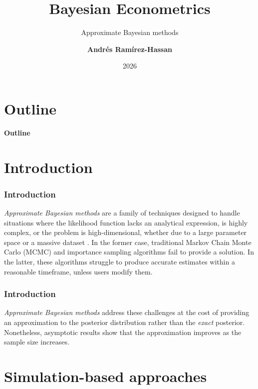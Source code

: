 \documentclass[12pt, compress]{beamer}
\title{Bayesian Econometrics}
\subtitle{Approximate Bayesian methods}
\date{2026}
\author[Andr\'e Ram\'irez H.]{\textbf{Andr\'es Ram\'irez-Hassan}}
\institute[EAFIT]{\small{Universidad EAFIT\\School of Finance, Economics and Government}}
\begin{document}
	
	\maketitle
	
	
	
	
	\section*{Outline}
	\begin{frame}
		\textbf{\Large{Outline}}
		\tableofcontents
	\end{frame}
	
\section{Introduction}
	
\begin{frame}
	\frametitle{Introduction}
\textit{Approximate Bayesian methods} are a family of techniques designed to handle situations where the likelihood function lacks an analytical expression, is highly complex, or the problem is high-dimensional, whether due to a large parameter space or a massive dataset \citep{martin2024approximating}. In the former case, traditional Markov Chain Monte Carlo (MCMC) and importance sampling algorithms fail to provide a solution. In the latter, these algorithms struggle to produce accurate estimates within a reasonable timeframe, unless users modify them.
\end{frame}

\begin{frame}
	\frametitle{Introduction}
\textit{Approximate Bayesian methods} address these challenges at the cost of providing an approximation to the posterior distribution rather than the \textit{exact} posterior. Nonetheless, asymptotic results show that the approximation improves as the sample size increases.
\end{frame}

\section{Simulation-based approaches}
\end{document}

